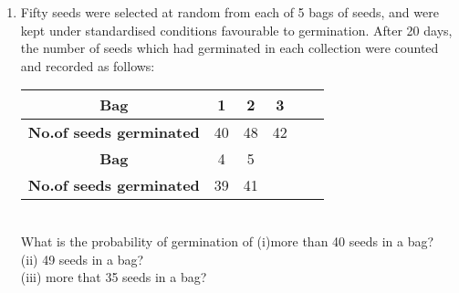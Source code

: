 \renewcommand{\theequation}{\theenumi}
\begin{enumerate}[label=\arabic*.,ref=\thesubsection.\theenumi]
\item Fifty seeds were selected at random from each of 5 bags of seeds, and were kept under standardised conditions favourable to germination. After 20 days, the
number of seeds which had germinated in each collection were counted and recorded as follows:\\

\begin{tabular}{ |c|c|c|c|c|c| } 
	\hline
	\textbf{Bag} &1 &2 &3 \\ 
	\hline
	\textbf{No.of seeds germinated} &40 &48 &42  \\ 
	\hline
	\textbf{Bag} &4 &5&\\ 
	\hline
	\textbf{No.of seeds germinated}  &39 &41& \\ 
	\hline
\end{tabular}\\

What is the probability of germination of
(i)more than 40 seeds in a bag?\\
(ii) 49 seeds in a bag?\\
(iii) more that 35 seeds in a bag?
\end{enumerate}